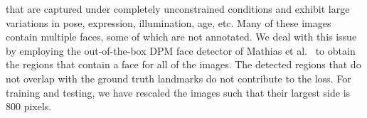 \documentclass[10pt,twocolumn,letterpaper]{article}
\begin{document}
that are captured under completely unconstrained conditions
and exhibit large variations in pose, expression, illumination,
age, etc.
 Many of these images contain multiple faces, some of which are not annotated. We deal with this issue by employing the out-of-the-box DPM face detector of Mathias et al.~\cite{mathias2014face} to obtain the regions that contain a face for all of the images. The detected regions that do not overlap with the ground truth landmarks do not contribute to the loss. For training and testing, we have rescaled the images such that their largest side is 800 pixels.
\end{document}
